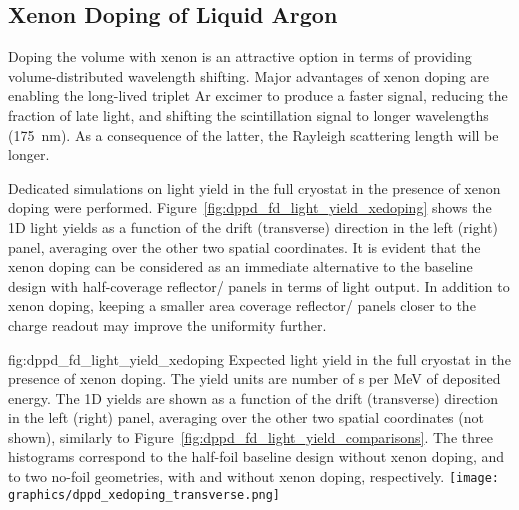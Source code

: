 \subsection{Xenon Doping of Liquid Argon}
\label{sec:dp-pds-appendix-xedoping}

Doping the  volume with xenon is an attractive option in terms of providing %
volume-distributed wavelength shifting. Major advantages of xenon doping are enabling the long-lived triplet Ar excimer to produce a faster signal, reducing the fraction of late light, and shifting the scintillation signal to longer wavelengths (\SI{175}{nm}). As a consequence of the latter, the Rayleigh scattering length will be longer.

Dedicated simulations on light yield in the full  cryostat in the presence of xenon doping were performed. Figure~\ref{fig:dppd_fd_light_yield_xedoping} shows the 1D light yields as a function of the drift (transverse) direction in the left (right) panel, averaging over the other two spatial coordinates. It is evident that the xenon doping can be considered as an immediate alternative to the baseline design with half-coverage reflector/ panels in terms of light output. In addition to xenon doping, keeping a smaller area coverage reflector/ panels closer to the charge readout may improve the uniformity further. 


\begin{dunefigure}{fig:dppd_fd_light_yield_xedoping}
{Expected light yield in the full   cryostat in the presence of xenon doping. The yield units are number of \phel{}s per \si{\MeV} of deposited energy. The 1D yields are shown as a function of the drift (transverse) direction in the left (right) panel, averaging over the other two spatial coordinates (not shown), similarly to Figure~\ref{fig:dppd_fd_light_yield_comparisons}. The three histograms correspond to the half-foil baseline design without xenon doping, and to two no-foil geometries, with and without xenon doping, respectively.}
 \hfill
\texttt{[image: graphics/dppd\_xedoping\_transverse.png]}
\end{dunefigure}